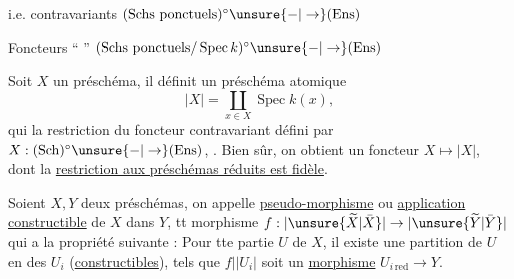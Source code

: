 i.e. contravariants $(\text{Schs ponctuels})^\circ\unsure{-|\to}(\mathrm{Ens})$

Foncteurs `` '' $(\text{Schs ponctuels}/\operatorname{Spec}k)^\circ\unsure{-|\to}(\mathrm{Ens})$

Soit $X$ un préschéma, il définit un préschéma atomique
\[
|X|=\coprod_{x\in X}\operatorname{Spec}k(x),
\]
qui  
la restriction du foncteur contravariant défini par
$X:(\mathrm{Sch})^\circ\unsure{-|\to}(\mathrm{Ens})$,
.
Bien sûr, on obtient un foncteur $X\mapsto|X|$,
dont la \uline{restriction aux préschémas réduits est fidèle}.

Soient $X,Y$ deux préschémas, on appelle \uline{pseudo-morphisme}
ou \uline{application constructible} de $X$ dans $Y$, tt morphisme
$f:|\unsure{\widetilde X|\bar X}|\to|\unsure{\widetilde Y|\bar Y}|$
qui a la propriété suivante : Pour tte partie
  $U$ de $X$,
il existe une partition de $U$ en des $U_i$ 
(\uline{constructibles}), tels que $f||U_i|$ soit un
\uline{morphisme} $U_{i\,\mathrm{red}}\to Y$.


